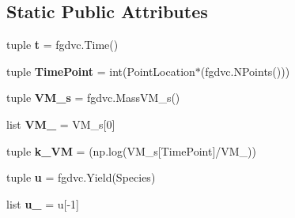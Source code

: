 \subsection*{\-Static \-Public \-Attributes}
\begin{DoxyCompactItemize}
\item 
\hypertarget{classFit__one__run_1_1TwoPointEstimator_a6c39dcbb0080c491a71ac30396aa0645}{tuple {\bfseries t} = fgdvc.\-Time()}\label{classFit__one__run_1_1TwoPointEstimator_a6c39dcbb0080c491a71ac30396aa0645}

\item 
\hypertarget{classFit__one__run_1_1TwoPointEstimator_ab3a7fb75aba8e43cffa61a1200b99544}{tuple {\bfseries \-Time\-Point} = int(\-Point\-Location$\ast$(fgdvc.\-N\-Points()))}\label{classFit__one__run_1_1TwoPointEstimator_ab3a7fb75aba8e43cffa61a1200b99544}

\item 
\hypertarget{classFit__one__run_1_1TwoPointEstimator_a5e0e5ecac04d21f9621680204b95703e}{tuple {\bfseries \-V\-M\-\_\-s} = fgdvc.\-Mass\-V\-M\-\_\-s()}\label{classFit__one__run_1_1TwoPointEstimator_a5e0e5ecac04d21f9621680204b95703e}

\item 
\hypertarget{classFit__one__run_1_1TwoPointEstimator_a1d81eb16e93c05a7b1b825dae06bcfd1}{list {\bfseries \-V\-M\-\_} = \-V\-M\-\_\-s\mbox{[}0\mbox{]}}\label{classFit__one__run_1_1TwoPointEstimator_a1d81eb16e93c05a7b1b825dae06bcfd1}

\item 
\hypertarget{classFit__one__run_1_1TwoPointEstimator_a801660f443434df295bc9c05e88bcef8}{tuple {\bfseries k\-\_\-\-V\-M} = (np.\-log(\-V\-M\-\_\-s\mbox{[}\-Time\-Point\mbox{]}/\-V\-M\-\_))}\label{classFit__one__run_1_1TwoPointEstimator_a801660f443434df295bc9c05e88bcef8}

\item 
\hypertarget{classFit__one__run_1_1TwoPointEstimator_abbd0ff8457dd988322c2cea1604a9a82}{tuple {\bfseries u} = fgdvc.\-Yield(\-Species)}\label{classFit__one__run_1_1TwoPointEstimator_abbd0ff8457dd988322c2cea1604a9a82}

\item 
\hypertarget{classFit__one__run_1_1TwoPointEstimator_a2e9224ae9f76276863605582c6950a3d}{list {\bfseries u\-\_} = u\mbox{[}-\/1\mbox{]}}\label{classFit__one__run_1_1TwoPointEstimator_a2e9224ae9f76276863605582c6950a3d}

\end{DoxyCompactItemize}


